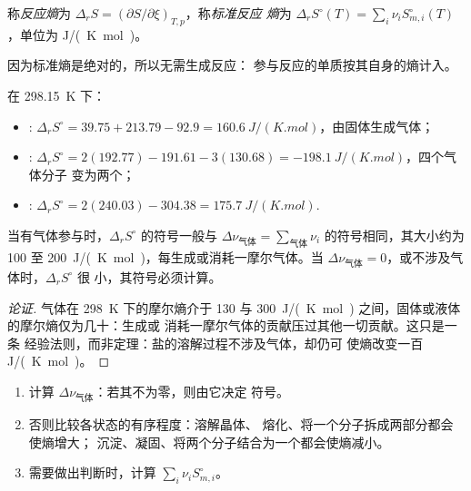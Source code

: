 \begin{definition}[反应熵]\label{def:b2:reaction-free-energy:reaction-entropy}
称\emph{反应熵}为 $\Delta_r S =
(\partial S/\partial\xi)_{T,p}$，称\emph{标准反应
熵}为 $\Delta_r S^\circ(T) =
\sum_i\nu_iS^\circ_{m,i}(T)$，单位为 \unit{J/(K.mol)}。
\end{definition}

因为标准熵是绝对的，所以无需生成反应：
参与反应的单质按其自身的熵计入。

\begin{example}[三个反应熵]\label{ex:b2:reaction-free-energy:entropies}
在 \qty{298.15}{K} 下：
\begin{itemize}
  \item {}: $\Delta_r S^\circ = 39.75 + 213.79 -
        92.9 = \qty{+160.6}{J/(K.mol)}$，由固体生成气体；
  \item {}: $\Delta_r S^\circ = 2(192.77) -
        191.61 - 3(130.68) = \qty{-198.1}{J/(K.mol)}$，四个气体分子
        变为两个；
  \item {}: $\Delta_r S^\circ = 2(240.03) - 304.38 =
        \qty{+175.7}{J/(K.mol)}$.
\end{itemize}
\end{example}

\begin{proposition}[反应熵的符号]\label{prop:b2:reaction-free-energy:sign-rule}
当有气体参与时，$\Delta_r S^\circ$ 的符号一般与
$\Delta\nu_{\text{气体}} = \sum_{\text{气体}}\nu_i$ 的符号相同，其大小约为
\qty{100}{} 至 \qty{200}{J/(K.mol)}，每生成或消耗一摩尔气体。当
$\Delta\nu_{\text{气体}} = 0$，或不涉及气体时，$\Delta_r S^\circ$ 很
小，其符号必须计算。
\end{proposition}

\begin{proof}[论证]
气体在 \qty{298}{K} 下的摩尔熵介于 130 与
\qty{300}{J/(K.mol)} 之间，固体或液体的摩尔熵仅为几十：生成或
消耗一摩尔气体的贡献压过其他一切贡献。这只是一条
经验法则，而非定理：盐的溶解过程不涉及气体，却仍可
使熵改变一百 \unit{J/(K.mol)}。
\end{proof}

\begin{method}\label{met:b2:reaction-free-energy:entropy-sign}
\begin{enumerate}
  \item 计算 $\Delta\nu_{\text{气体}}$：若其不为零，则由它决定
        符号。
  \item 否则比较各状态的有序程度：溶解晶体、
        熔化、将一个分子拆成两部分都会使熵增大；
        沉淀、凝固、将两个分子结合为一个都会使熵减小。
  \item 需要做出判断时，计算 $\sum_i\nu_iS^\circ_{m,i}$。
\end{enumerate}
\end{method}


